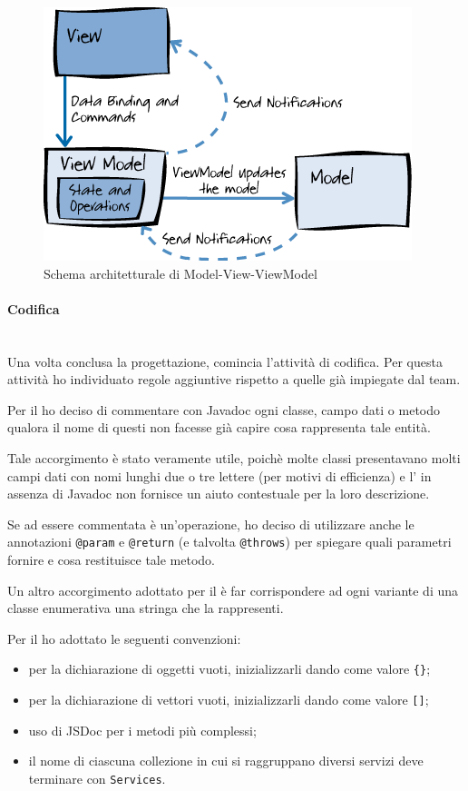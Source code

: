 \begin{figure}[H]%
\centering
\includegraphics[width=.7\columnwidth]{immagini/mvvm}
\caption{Schema architetturale di Model-View-ViewModel}
\label{fig:mvvm}%
\end{figure}

\paragraph{Codifica} \mbox{} \\

Una volta conclusa la progettazione, comincia l'attività di codifica. Per
questa attività ho individuato regole aggiuntive rispetto a quelle già
impiegate dal team.

Per il \BKEND{} ho deciso di commentare con Javadoc ogni classe, campo dati o
metodo qualora il nome di questi non facesse già capire cosa rappresenta tale
entità.

Tale accorgimento è stato veramente utile, poichè molte classi presentavano
molti campi dati con nomi lunghi due o tre lettere (per motivi di efficienza)
e l' in assenza di Javadoc non fornisce un aiuto contestuale per la
loro descrizione.

Se ad essere commentata è un'operazione, ho deciso di utilizzare anche le
annotazioni \texttt{@param} e \texttt{@return} (e talvolta \texttt{@throws})
per spiegare quali parametri fornire e cosa restituisce tale metodo.

Un altro accorgimento adottato per il \BKEND{} è far corrispondere ad ogni
variante di una classe enumerativa una stringa che la rappresenti.

Per il \FREND{} ho adottato le seguenti convenzioni:

\begin{itemize}
\item per la dichiarazione di oggetti vuoti, inizializzarli dando come valore
  \texttt{\{\}};
\item per la dichiarazione di vettori vuoti, inizializzarli dando come valore
  \texttt{[]};
\item uso di JSDoc per i metodi più complessi;
\item il nome di ciascuna collezione in cui si raggruppano diversi servizi
  deve terminare con \texttt{Services}.
\end{itemize}

